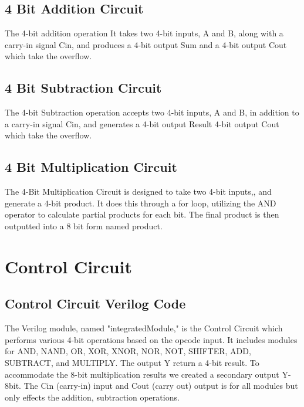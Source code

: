 \documentclass[12pt]{article}
\begin{document}


\subsection{4 Bit Addition Circuit}

The 4-bit addition operation It takes two 4-bit inputs, A and B, along with a carry-in signal Cin, and produces a 4-bit output Sum and a 4-bit output Cout which take the overflow.



\subsection{4 Bit Subtraction Circuit}

The 4-bit Subtraction operation accepts two 4-bit inputs, A and B, in addition to a carry-in signal Cin, and generates a 4-bit output Result 4-bit output Cout which take the overflow.



\subsection{4 Bit Multiplication Circuit}

The 4-Bit Multiplication Circuit is designed to take two 4-bit inputs,, and generate a 4-bit product. It does this through a for loop, utilizing the AND operator to calculate partial products for each bit. The final product is then outputted into a 8 bit form named product.



\section{Control Circuit}

\subsection{Control Circuit Verilog Code}
 
The Verilog module, named "integratedModule," is the Control Circuit which performs various 4-bit operations based on the opcode input. It includes modules for AND, NAND, OR, XOR, XNOR, NOR, NOT, SHIFTER, ADD, SUBTRACT, and MULTIPLY. The output Y  return a 4-bit result. To accommodate the 8-bit multiplication results we created a secondary output Y-8bit. The Cin (carry-in) input and Cout (carry out) output is for all modules but only effects the addition, subtraction operations.  \\
\end{document}
